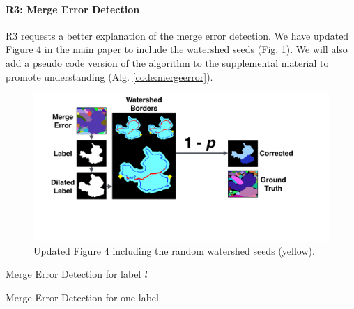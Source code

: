 \documentclass[10pt,twocolumn,letterpaper]{article}
\begin{document}
\paragraph{R3: Merge Error Detection}
R3 requests a better explanation of the merge error detection. We have updated Figure 4 in the main paper to include the watershed seeds (Fig. 1). We will also add a pseudo code version of the algorithm to the supplemental material to promote understanding (Alg. \ref{code:mergeerror}).

\begin{figure}[h]
\centering
\includegraphics[width=\linewidth]{gfx/merge_error_v5.pdf}
\caption{Updated Figure 4 including the random watershed seeds (yellow).}
\label{fig:merge_error}
\end{figure}

\begin{algorithm}
\caption{Merge Error Detection for label \emph{l}}\label{code:mergeerror}
\begin{algorithmic}[1]

\end{algorithmic}
\end{algorithm}

\begin{algorithm}
\caption{Merge Error Detection for one label}\label{code:mergeerror2}
\begin{algorithmic}[1]
	\EndFor

\end{algorithmic}
\end{algorithm}
\end{document}
